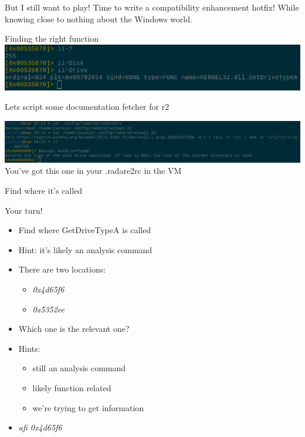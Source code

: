 \documentclass{beamer}
\begin{document}
\begin{frame}{But I still want to play!}
	Time to write a \alert{compatibility enhancement hotfix}!
	\pause
	While knowing close to nothing about the Windows world.
\end{frame}

\begin{frame}{Finding the right function}
	\includegraphics[width=\textwidth]{ii.png}\\
\end{frame}

\begin{frame}{Lets script some documentation fetcher for r2}
	\begin{center}
		\includegraphics[width=\textwidth,height=.3\textheight]{script.png}\\
		\pause
		You've got this one in your .radare2rc in the VM
	\end{center}
\end{frame}

\begin{frame}{Find where it's called}
	\begin{block}{Your turn!}
		\begin{itemize}[<+->]
			\item Find where \alert{GetDriveTypeA} is called
			\item Hint: it's likely an \alert{a}nalysis command
			\item There are two locations:
				\begin{itemize}
					\item \emph{0x4d65f6}
					\item \emph{0x5352ee}
				\end{itemize}
			\item Which one is the relevant one?
			\item Hints:
				\begin{itemize}
					\item still an \alert{a}nalysis command
					\item likely \alert{f}unction related
					\item we're trying to get \alert{i}nformation
				\end{itemize}
			\item \emph{afi 0x4d65f6}
		\end{itemize}
	\end{block}
\end{frame}
\end{document}
